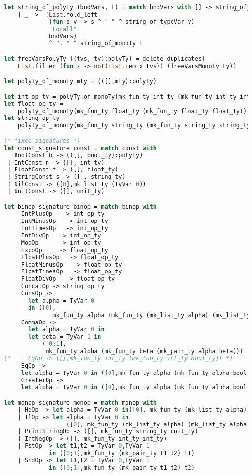 \begin{lstlisting}[language=Caml, caption=definitions.ml]
let string_of_polyTy (bndVars, t) = match bndVars with [] -> string_of_monoTy t
    | _ ->  (List.fold_left
             (fun s v -> s ^ " " ^ string_of_typeVar v)
             "Forall"
             bndVars)
             ^ ". " ^ string_of_monoTy t

let freeVarsPolyTy ((tvs, ty):polyTy) = delete_duplicates(
    List.filter (fun x -> not(List.mem x tvs)) (freeVarsMonoTy ty))

let polyTy_of_monoTy mty = (([],mty):polyTy)

let int_op_ty = polyTy_of_monoTy(mk_fun_ty int_ty (mk_fun_ty int_ty int_ty))
let float_op_ty =
    polyTy_of_monoTy(mk_fun_ty float_ty (mk_fun_ty float_ty float_ty))
let string_op_ty =
    polyTy_of_monoTy(mk_fun_ty string_ty (mk_fun_ty string_ty string_ty))

(* fixed signatures *)
let const_signature const = match const with
   BoolConst b -> (([], bool_ty):polyTy)
 | IntConst n -> ([], int_ty)
 | FloatConst f -> ([], float_ty)
 | StringConst s -> ([], string_ty)
 | NilConst -> ([0],mk_list_ty (TyVar 0))
 | UnitConst -> ([], unit_ty)

let binop_signature binop = match binop with
     IntPlusOp   -> int_op_ty
   | IntMinusOp   -> int_op_ty
   | IntTimesOp   -> int_op_ty
   | IntDivOp   -> int_op_ty
   | ModOp      -> int_op_ty
   | ExpoOp     -> float_op_ty
   | FloatPlusOp   -> float_op_ty
   | FloatMinusOp   -> float_op_ty
   | FloatTimesOp   -> float_op_ty
   | FloatDivOp   -> float_op_ty
   | ConcatOp -> string_op_ty
   | ConsOp -> 
       let alpha = TyVar 0
       in ([0], 
              mk_fun_ty alpha (mk_fun_ty (mk_list_ty alpha) (mk_list_ty alpha)))
   | CommaOp ->
       let alpha = TyVar 0 in
       let beta = TyVar 1 in
           ([0;1],
            mk_fun_ty alpha (mk_fun_ty beta (mk_pair_ty alpha beta)))
(*   | EqOp -> ([],mk_fun_ty int_ty (mk_fun_ty int_ty bool_ty)) *)
   | EqOp ->
     let alpha = TyVar 0 in ([0],mk_fun_ty alpha (mk_fun_ty alpha bool_ty))
   | GreaterOp ->
     let alpha = TyVar 0 in ([0],mk_fun_ty alpha (mk_fun_ty alpha bool_ty))

let monop_signature monop = match monop with
    | HdOp -> let alpha = TyVar 0 in([0], mk_fun_ty (mk_list_ty alpha) alpha)
    | TlOp -> let alpha = TyVar 0 in
                  ([0], mk_fun_ty (mk_list_ty alpha) (mk_list_ty alpha))
    | PrintStringOp -> ([], mk_fun_ty string_ty unit_ty)
    | IntNegOp -> ([], mk_fun_ty int_ty int_ty)
    | FstOp -> let t1,t2 = TyVar 0,TyVar 1
             in ([0;1],mk_fun_ty (mk_pair_ty t1 t2) t1)
    | SndOp -> let t1,t2 = TyVar 0,TyVar 1
             in ([0;1],mk_fun_ty (mk_pair_ty t1 t2) t2)


\end{lstlisting}
